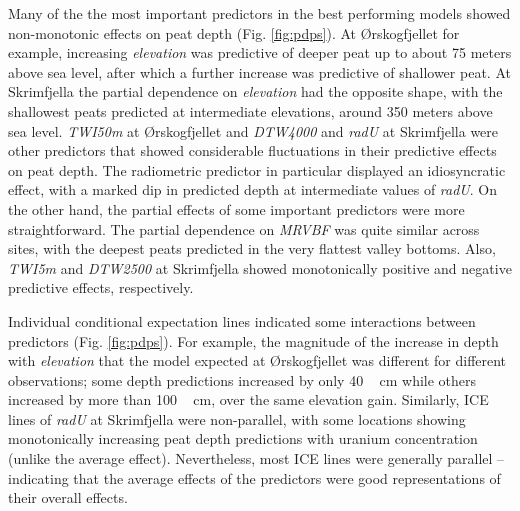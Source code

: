 \documentclass[soil, manuscript]{copernicus}
\begin{document}
Many of the the most important predictors in the best performing models showed non-monotonic effects on peat depth (Fig. \ref{fig:pdps}).
At Ørskogfjellet for example, increasing \emph{elevation} was predictive of deeper peat up to about 75 meters above sea level, after which a further increase was predictive of shallower peat.
At Skrimfjella the partial dependence on \emph{elevation} had the opposite shape, with the shallowest peats predicted at intermediate elevations, around 350 meters above sea level.
\emph{TWI50m} at Ørskogfjellet and \emph{DTW4000} and \emph{radU} at Skrimfjella were other predictors that showed considerable fluctuations in their predictive effects on peat depth.
The radiometric predictor in particular displayed an idiosyncratic effect, with a marked dip in predicted depth at intermediate values of \emph{radU}.
On the other hand, the partial effects of some important predictors were more straightforward.
The partial dependence on \emph{MRVBF} was quite similar across sites, with the deepest peats predicted in the very flattest valley bottoms.
Also, \emph{TWI5m} and \emph{DTW2500} at Skrimfjella showed monotonically positive and negative predictive effects, respectively.

Individual conditional expectation lines indicated some interactions between predictors (Fig. \ref{fig:pdps}).
For example, the magnitude of the increase in depth with \emph{elevation} that the model expected at Ørskogfjellet was different for different observations; some depth predictions increased by only \unit{40\,cm} while others increased by more than \unit{100\,cm}, over the same elevation gain.
Similarly, ICE lines of \emph{radU} at Skrimfjella were non-parallel, with some locations showing monotonically increasing peat depth predictions with uranium concentration (unlike the average effect).
Nevertheless, most ICE lines were generally parallel -- indicating that the average effects of the predictors were good representations of their overall effects.
\end{document}
